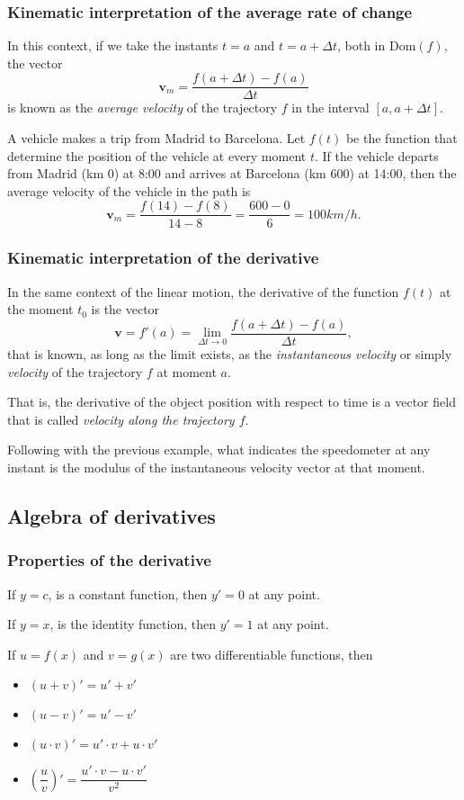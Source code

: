 \begin{frame}
\frametitle{Kinematic interpretation of the average rate of change}
In this context, if we take the instants $t=a$ and $t=a+\Delta t$, both in $\mbox{Dom}(f)$, the vector
\[
\mathbf{v}_m=\frac{f(a+\Delta t)-f(a)}{\Delta t}
\]
is known as the \emph{average velocity} of the trajectory $f$ in the interval $[a, a+\Delta t]$.

A vehicle makes a trip from Madrid to Barcelona.
Let $f(t)$ be the function that determine the position of the vehicle at every moment $t$.
If the vehicle departs from Madrid (km 0) at 8:00 and arrives at Barcelona (km 600) at 14:00, then the average velocity
of the vehicle in the path is
\[
\mathbf{v}_m=\frac{f(14)-f(8)}{14-8}=\frac{600-0}{6} = 100 km/h.
\]
\end{frame}


\begin{frame}
\frametitle{Kinematic interpretation of the derivative}
In the same context of the linear motion, the derivative of the function $f(t)$ at the moment $t_0$ is the vector
\[
\mathbf{v}=f'(a)=\lim_{\Delta t\rightarrow 0}\frac{f(a+\Delta t)-f(a)}{\Delta t},
\]
that is known, as long as the limit exists, as the \emph{instantaneous velocity} or simply \emph{velocity} of the trajectory $f$ at moment $a$.

That is, the derivative of the object position with respect to time is a vector field that is called \emph{velocity along the trajectory $f$}.

Following with the previous example, what indicates the speedometer at any instant is the modulus of the instantaneous velocity vector at that moment.
\end{frame}


\subsection{Algebra of derivatives}
\begin{frame}
\frametitle{Properties of the derivative}
If $y=c$, is a constant function, then $y'=0$ at any point.

If $y=x$, is the identity function, then  $y'=1$ at any point.

If $u=f(x)$ and $v=g(x)$ are two differentiable functions, then 
\begin{itemize}
\item $(u+v)'=u'+v'$
\item $(u-v)'=u'-v'$
\item $(u\cdot v)'=u'\cdot v+ u\cdot v'$
\item $\left(\dfrac{u}{v}\right)'=\dfrac{u'\cdot v-u\cdot v'}{v^2}$
\end{itemize}
\end{frame}


